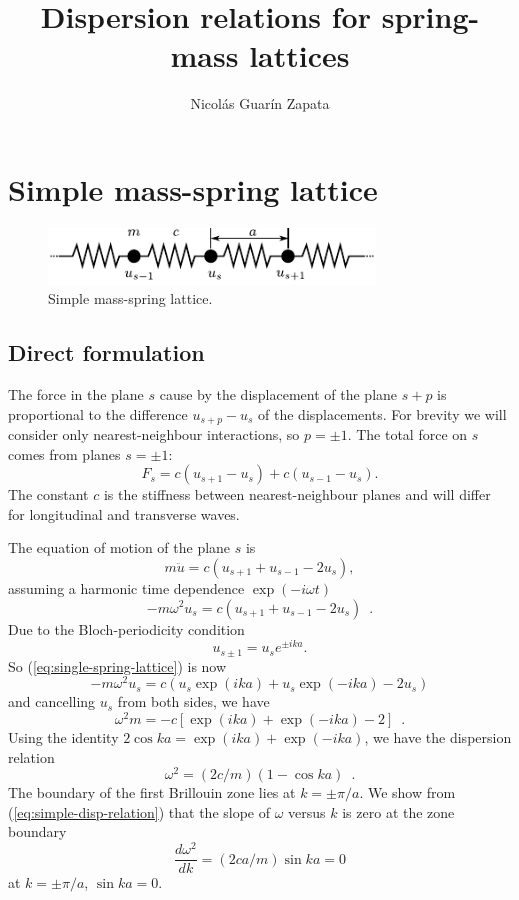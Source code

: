 \documentclass[12pt,letterpaper]{article}
\author{Nicol\'as Guar\'in Zapata}
\title{\textbf{Dispersion relations for spring-mass lattices}}
\begin{document}
\maketitle

\section{Simple mass-spring lattice}
\begin{figure}[h]
\centering
\includegraphics[height=1.5cm]{img/spring-mass.pdf} 
\caption{Simple mass-spring lattice.}
\end{figure}
\subsection{Direct formulation}
The force in the plane $s$ cause by the displacement of the plane $s+p$ is proportional to the difference $u_{s+p}-u_s$ of the displacements. For brevity we will consider only nearest-neighbour interactions, so $p=\pm 1$. The total force on $s$ comes from planes $s=\pm 1$:
\begin{equation}
F_s = c(u_{s+1}-u_s)+ c(u_{s-1}-u_s).
\end{equation}
The constant $c$ is the stiffness between nearest-neighbour planes and will differ for longitudinal and transverse waves.

The equation of motion of the plane $s$ is
\[ m  \ddot{u} = c(u_{s+1} + u_{s-1} -2 u_s), \]
assuming a harmonic time dependence $\exp(-i\omega t)$
\begin{equation}
-m\omega^2 u_s = c(u_{s+1} + u_{s-1} - 2u_s) \enspace .
\label{eq:single-spring-lattice}
\end{equation}
Due to the Bloch-periodicity condition
\[u_{s\pm 1} = u_s e^{\pm i ka}. \]
So (\ref{eq:single-spring-lattice}) is now
\[ -m \omega^2 u_s = c (u_s \exp(ika) + u_s \exp(-ika) - 2u_s) \]
and cancelling $u_s$ from both sides, we have
\[ \omega^2 m = -c[ \exp(ika) + \exp(-ika) - 2 ] \enspace .\]
Using the identity $2\cos ka = \exp(ika) + \exp(-ika)$, we have the dispersion relation
\begin{equation}
\omega^2 = (2c/m) (1-\cos ka) \enspace .
\label{eq:simple-disp-relation}
\end{equation}
The boundary of the first Brillouin zone lies at $k=\pm \pi/a$. We show from (\ref{eq:simple-disp-relation}) that the slope of $\omega$ versus $k$ is zero at the zone boundary
\[ \frac{d\omega^2}{dk} = (2ca/m)\sin ka=0\]
at $k=\pm \pi/a$, $\sin ka = 0$.
\end{document}
